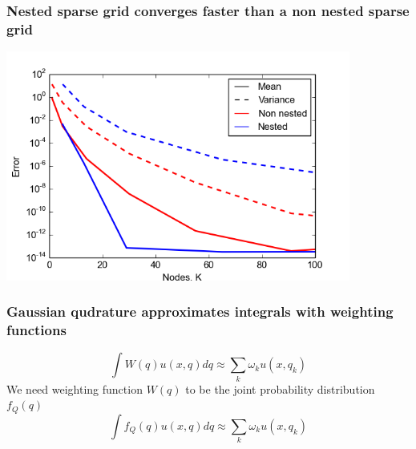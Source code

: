 \documentclass{beamer}
\begin{document}
  \begin{frame}
 \frametitle{Nested sparse grid converges faster than a non nested sparse grid}%
 \begin{center}
                 \includegraphics[width=0.85\textwidth]{convergence_2D_L_sparse.png}

          \end{center}
%
%
%
\end{frame}



 \begin{frame}
  \frametitle{Gaussian qudrature approximates integrals with weighting functions}
\[  \int W(q)u(x,q)dq \approx \sum_k \omega_k u(x,q_k) \]
\pause
We need weighting function $W(q)$ to be the joint probability distribution $f_Q(q)$
\pause
\[ \int f_Q(q)u(x,q)dq \approx \sum_k \omega_k u(x,q_k) \]
    \end{frame}
\end{document}
